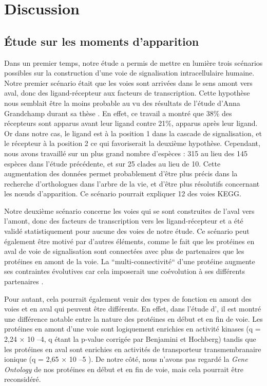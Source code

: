 \chapter[Discussion]{Discussion}
\thispagestyle{firstpage}
\onehalfspacing

\section{Étude sur les moments d’apparition}
\par Dans un premier temps, notre étude a permis de mettre en lumière trois scénarios possibles sur la construction d’une voie de signalisation intracellulaire humaine. Notre premier scénario était que les voies sont arrivées dans le sens amont vers aval, donc des ligand-récepteur aux facteurs de transcription. Cette hypothèse nous semblait être la moins probable au vu des résultats de l’étude d’Anna Grandchamp durant sa thèse \parencite{grandchamp_synchronous_2018}. En effet, ce travail a montré que 38\% des récepteurs sont apparus avant leur ligand contre 21\%, apparus après leur ligand. Or dans notre cas, le ligand est à la position 1 dans la cascade de signalisation, et le récepteur à la position 2 ce qui favoriserait la deuxième hypothèse. Cependant, nous avons travaillé sur un plus grand nombre d’espèces : 315 au lieu des 145 espèces dans l’étude précédente, et sur 25 clades au lieu de 10. Cette augmentation des données permet probablement d’être plus précis dans la recherche d’orthologues dans l’arbre de la vie, et d’être plus résolutifs concernant les nœuds d’apparition. Ce scénario pourrait expliquer 12 des voies KEGG. 
\par Notre deuxième scénario concerne les voies qui se sont construites de l’aval vers l’amont, donc des facteurs de transcription vers les ligand-récepteur et a été validé statistiquement pour aucune des voies de notre étude. Ce scénario peut également être motivé par d’autres éléments, comme le fait que les protéines en aval de voie de signalisation sont connectées avec plus de partenaires que les protéines en amont de la voie. La “multi-connectivité“ d’une protéine augmente ses contraintes évolutives car cela imposerait une coévolution à ses différents partenaires \parencite{fraser_evolutionary_2002, hahn_molecular_2004, krylov_gene_2003}. 
\par Pour autant, cela pourrait également venir des types de fonction en amont des voies et en aval qui peuvent être différents. En effet, dans l’étude d’\cite{alvarez-ponce_relationship_2012}, il est montré une différence notable entre la nature des protéines en début et en fin de voie. Les protéines en amont d’une voie sont logiquement enrichies en activité kinases (q = 2,24 × 10 –4, q étant la p-value corrigée par Benjamini et Hochberg) tandis que les protéines en aval sont enrichies en activités de transporteur transmembranaire ionique (q = 2,65 × 10 –5 ). De notre côté, nous n’avons pas regardé la \textit{Gene Ontology} de nos protéines en début et en fin de voie, mais cela pourrait être reconsidéré.
